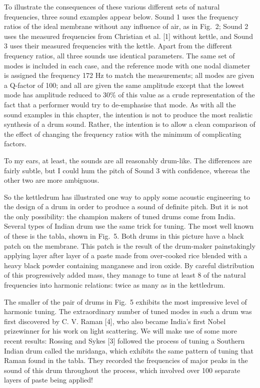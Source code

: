   To illustrate the consequences of these various different sets of natural 
  frequencies, three sound examples appear below. Sound 1 uses the frequency 
  ratios of the ideal membrane without any influence of air, as in Fig.\ 2; 
  Sound 2 uses the measured frequencies from Christian et al. [1] without 
  kettle, and Sound 3 uses their measured frequencies with the kettle. Apart 
  from the different frequency ratios, all three sounds use identical 
  parameters. The same set of modes is included in each case, and the reference 
  mode with one nodal diameter is assigned the frequency 172 Hz to match the 
  measurements; all modes are given a Q-factor of 100; and all are given the 
  same amplitude except that the lowest mode has amplitude reduced to 30\% of 
  this value as a crude representation of the fact that a performer would try 
  to de-emphasise that mode. As with all the sound examples in this chapter, 
  the intention is not to produce the most realistic synthesis of a drum sound. 
  Rather, the intention is to allow a clean comparison of the effect of 
  changing the frequency ratios with the minimum of complicating factors. 

  To my ears, at least, the sounds are all reasonably drum-like. The 
  differences are fairly subtle, but I could hum the pitch of Sound 3 with 
  confidence, whereas the other two are more ambiguous. 

  So the kettledrum has illustrated one way to apply some acoustic engineering 
  to the design of a drum in order to produce a sound of definite pitch. But it 
  is not the only possibility: the champion makers of tuned drums come from 
  India. Several types of Indian drum use the same trick for tuning. The most 
  well known of these is the tabla, shown in Fig.\ 5. Both drums in this 
  picture have a black patch on the membrane. This patch is the result of the 
  drum-maker painstakingly applying layer after layer of a paste made from 
  over-cooked rice blended with a heavy black powder containing manganese and 
  iron oxide. By careful distribution of this progressively added mass, they 
  manage to tune at least 8 of the natural frequencies into harmonic relations: 
  twice as many as in the kettledrum. 

  The smaller of the pair of drums in Fig.\ 5 exhibits the most impressive 
  level of harmonic tuning. The extraordinary number of tuned modes in such a 
  drum was first discovered by C. V. Raman [4], who also became India's first 
  Nobel prizewinner for his work on light scattering. We will make use of some 
  more recent results: Rossing and Sykes [3] followed the process of tuning a 
  Southern Indian drum called the mridanga, which exhibits the same pattern of 
  tuning that Raman found in the tabla. They recorded the frequencies of major 
  peaks in the sound of this drum throughout the process, which involved over 
  100 separate layers of paste being applied! 

